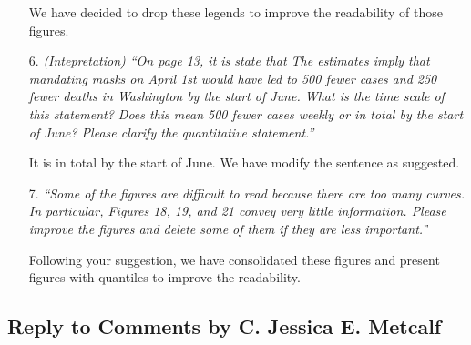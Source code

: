 \documentclass[11pt]{article}
\begin{document}
\begin{itemize}
We have decided to drop these legends to improve the readability of those figures. 

\item[6. ]  \textit{(Intepretation) ``On page 13, it is state that
The estimates imply that mandating masks on April 1st would have led to 500
fewer cases and 250 fewer deaths in Washington by the start of June.
What is the time scale of this statement? Does this mean 500 fewer cases weekly or in total
by the start of June? Please clarify the quantitative statement.''}

It is in total by the start of June. We have modify the sentence as suggested.  

\item[7.]  \textit{``Some of the figures are difficult to read because there are too many curves. In particular,
Figures 18, 19, and 21 convey very little information. Please improve the figures and delete
some of them if they are less important.''}

Following your suggestion, we have consolidated these figures and present figures with quantiles to improve the readability.

\end{itemize} 
 
\newpage

\replytitle
\subsection*{Reply to Comments by C. Jessica E. Metcalf }

\changes
\end{document}
